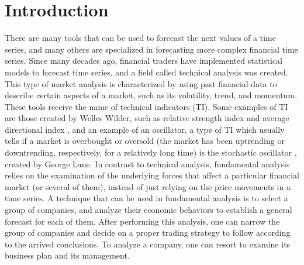 \documentclass[a4paper,twoside]{article}
\begin{document}
\onecolumn \maketitle \normalsize \vfill

\section{Introduction}
\label{introduction}

There are many tools that can be used to forecast the next values of a time series, and many others are specialized in forecasting more complex financial time series. Since many decades ago, financial traders have implemented statistical models to forecast time series, and a field called technical analysis was created. This type of market analysis is characterized by using past financial data to describe certain aspects of a market, such as its volatility, trend, and momentum. These tools receive the name of technical indicators (TI). Some examples of TI are those created by Welles Wilder, such as relative strength index and average directional index \cite{wilder1978new}, and an example of an oscillator, a type of TI which usually tells if a market is overbought or oversold (the market has been uptrending or downtrending, respectively, for a relatively long time) is the stochastic oscillator \cite{schirding1984stochastic}, created by George Lane. In contrast to technical analysis, fundamental analysis relies on the examination of the underlying forces that affect a particular financial market (or several of them), instead of just relying on the price movements in a time series. A technique that can be used in fundamental analysis is to select a group of companies, and analyze their economic behaviors to establish a general forecast for each of them. After performing this analysis, one can narrow the group of companies and decide on a proper trading strategy to follow according to the arrived conclusions. To analyze a company, one can resort to examine its business plan and its management.
\end{document}
